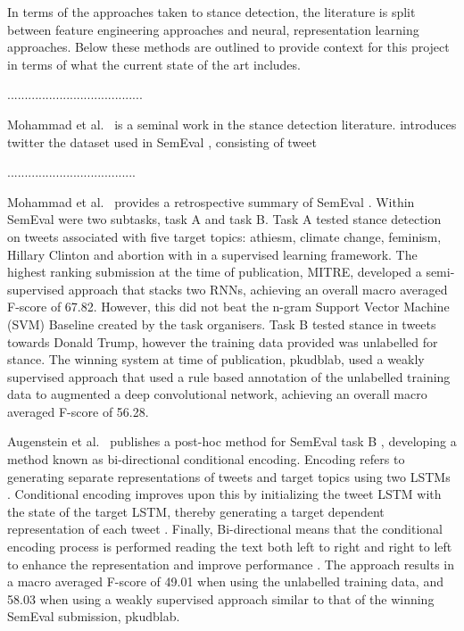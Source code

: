 \documentclass[Dissertation.tex]{subfiles}
\begin{document}
In terms of the approaches taken to stance detection, the literature is split between feature engineering approaches and neural, representation learning approaches. Below these methods are outlined to provide context for this project in terms of what the current state of the art includes.

.......................................

Mohammad et al.\ \cite{mohammadStanceSentimentTweets2016} is a seminal work in the stance detection literature. \cite{mohammadStanceSentimentTweets2016} introduces twitter the dataset used in SemEval \cite{TaskDetectingStance}, consisting of tweet

.....................................

Mohammad et al.\ \cite{mohammadSemEval2016TaskDetecting2016} provides a retrospective summary of SemEval \cite{TaskDetectingStance} . Within SemEval \cite{TaskDetectingStance} were two subtasks, task A and task B. Task A tested stance detection on tweets associated with five target topics: athiesm, climate change, feminism, Hillary Clinton and abortion with in  a supervised learning framework. The highest ranking submission at the time of publication, MITRE, developed a semi-supervised approach that stacks two RNNs, achieving an overall macro averaged F-score of 67.82. However, this did not beat the n-gram Support Vector Machine (SVM) Baseline created by the task organisers. Task B tested stance in tweets towards Donald Trump, however the training data provided was unlabelled for stance. The winning system at time of publication, pkudblab, used a weakly supervised approach that used a rule based annotation of the unlabelled training data to augmented a deep convolutional network, achieving an overall macro averaged F-score of 56.28.

Augenstein et al.\ \cite{augensteinStanceDetectionBidirectional2016} publishes a post-hoc method for SemEval task B \cite{TaskDetectingStance}, developing a method known as bi-directional conditional encoding. Encoding refers to generating separate representations of tweets and target topics using two LSTMs \cite{augensteinStanceDetectionBidirectional2016}\cite{hochreiterLongShorttermMemory1997}. Conditional encoding improves upon this by initializing the tweet LSTM with the state of the target LSTM, thereby generating a target dependent representation of each tweet \cite{augensteinStanceDetectionBidirectional2016}. Finally, Bi-directional means that the conditional encoding process is performed reading the text both left to right and right to left to enhance the representation and improve performance \cite{augensteinStanceDetectionBidirectional2016}. The approach results in a macro averaged F-score of 49.01 when using the unlabelled training data, and 58.03 when using a weakly supervised approach similar to that of the winning SemEval submission, pkudblab.
\end{document}
